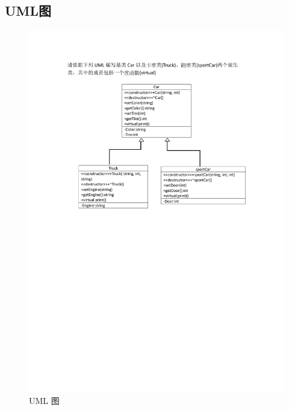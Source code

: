\documentclass[UTF8,18pt]{ctexart}
\begin{document}
\subsection{UML图}
\begin{figure}[H]
	\centering
	\includegraphics[scale=0.8]{uml.pdf}
	\caption{ UML 图}
	\label{fig:uml}
\end{figure}

\nocite{LiuHaiYang}
\nocite{cpp}
\nocite{for_range}
\nocite{xuhanshu}
\nocite{jicheng}
\nocite{jiekou}
\end{document}

